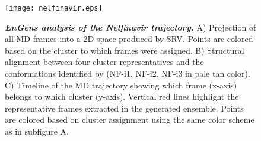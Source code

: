 \documentclass[unnumsec,webpdf,contemporary,large,numsquare]{oup-authoring-template}%
\theoremstyle{thmstyleone}%
\theoremstyle{thmstyletwo}%
\theoremstyle{thmstylethree}%
\begin{document}
\begin{figure}[!t]%
\centering
{\texttt{[image: nelfinavir.eps]}}
\caption{\textbf{\textit{EnGens analysis of the Nelfinavir trajectory. }} A) Projection of all MD frames into a 2D space produced by SRV. Points are colored based on the cluster to which frames were assigned. B) Structural alignment between four cluster representatives and the conformations identified by \citep{antunes_new_2014} (NF-i1, NF-i2, NF-i3 in pale tan color). C) Timeline of the MD trajectory showing which frame (x-axis) belongs to which cluster (y-axis). Vertical red lines highlight the representative frames extracted in the generated ensemble. Points are colored based on cluster assignment using the same color scheme as in subfigure A.}
\label{fig-res3}
\end{figure}
\end{document}
